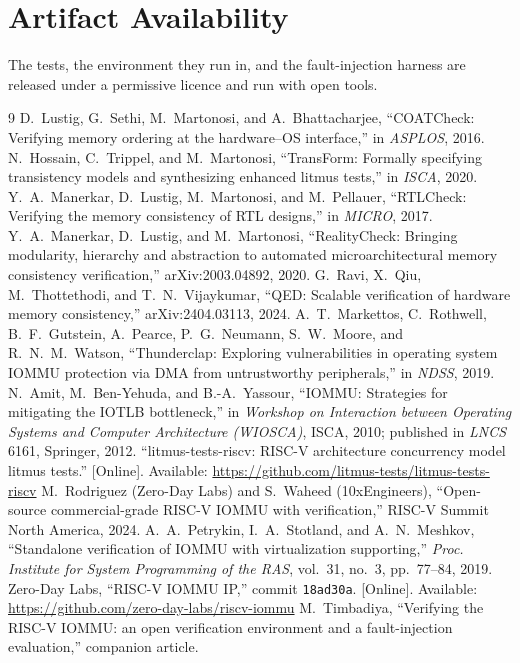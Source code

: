 \documentclass[journal]{IEEEtran}
\begin{document}
\section*{Artifact Availability}
The tests, the environment they run in, and the fault-injection harness are
released under a permissive licence and run with open tools.

\begin{thebibliography}{9}
 D.~Lustig, G.~Sethi, M.~Martonosi, and A.~Bhattacharjee,
``COATCheck: Verifying memory ordering at the hardware--OS interface,'' in
\emph{ASPLOS}, 2016.
 N.~Hossain, C.~Trippel, and M.~Martonosi,
``TransForm: Formally specifying transistency models and synthesizing enhanced
litmus tests,'' in \emph{ISCA}, 2020.
 Y.~A.~Manerkar, D.~Lustig, M.~Martonosi, and M.~Pellauer,
``RTLCheck: Verifying the memory consistency of RTL designs,'' in \emph{MICRO},
2017.
 Y.~A.~Manerkar, D.~Lustig, and M.~Martonosi,
``RealityCheck: Bringing modularity, hierarchy and abstraction to automated
microarchitectural memory consistency verification,'' arXiv:2003.04892, 2020.
 G.~Ravi, X.~Qiu, M.~Thottethodi, and T.~N.~Vijaykumar,
``QED: Scalable verification of hardware memory consistency,''
arXiv:2404.03113, 2024.
 A.~T.~Markettos, C.~Rothwell, B.~F.~Gutstein, A.~Pearce,
P.~G.~Neumann, S.~W.~Moore, and R.~N.~M.~Watson, ``Thunderclap: Exploring
vulnerabilities in operating system IOMMU protection via DMA from untrustworthy
peripherals,'' in \emph{NDSS}, 2019.
 N.~Amit, M.~Ben-Yehuda, and B.-A.~Yassour, ``IOMMU: Strategies
for mitigating the IOTLB bottleneck,'' in \emph{Workshop on Interaction between
Operating Systems and Computer Architecture (WIOSCA)}, ISCA, 2010; published in
\emph{LNCS} 6161, Springer, 2012.
 ``litmus-tests-riscv: RISC-V architecture concurrency
model litmus tests.'' [Online]. Available:
\url{https://github.com/litmus-tests/litmus-tests-riscv}
 M.~Rodriguez (Zero-Day Labs) and S.~Waheed (10xEngineers),
``Open-source commercial-grade RISC-V IOMMU with verification,'' RISC-V Summit
North America, 2024.
 A.~A.~Petrykin, I.~A.~Stotland, and A.~N.~Meshkov, ``Standalone
verification of IOMMU with virtualization supporting,'' \emph{Proc. Institute
for System Programming of the RAS}, vol.~31, no.~3, pp.~77--84, 2019.
 Zero-Day Labs, ``RISC-V IOMMU IP,'' commit \texttt{18ad30a}.
[Online]. Available: \url{https://github.com/zero-day-labs/riscv-iommu}
 M.~Timbadiya, ``Verifying the RISC-V IOMMU: an open
verification environment and a fault-injection evaluation,'' companion article.
\end{thebibliography}
\end{document}
